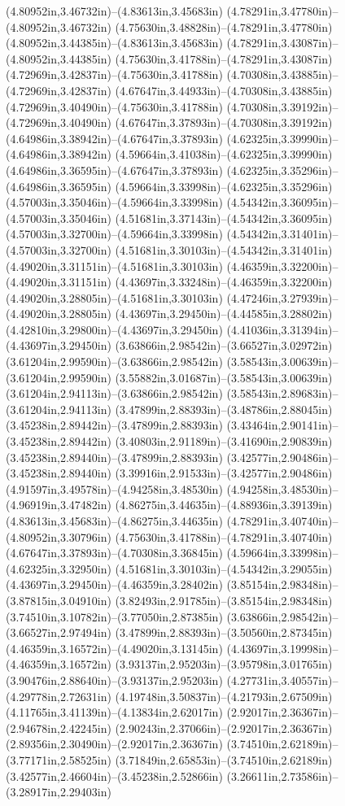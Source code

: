 (4.80952in,3.46732in)--(4.83613in,3.45683in) (4.78291in,3.47780in)--(4.80952in,3.46732in) (4.75630in,3.48828in)--(4.78291in,3.47780in) (4.80952in,3.44385in)--(4.83613in,3.45683in) (4.78291in,3.43087in)--(4.80952in,3.44385in) (4.75630in,3.41788in)--(4.78291in,3.43087in) (4.72969in,3.42837in)--(4.75630in,3.41788in) (4.70308in,3.43885in)--(4.72969in,3.42837in) (4.67647in,3.44933in)--(4.70308in,3.43885in) (4.72969in,3.40490in)--(4.75630in,3.41788in) (4.70308in,3.39192in)--(4.72969in,3.40490in) (4.67647in,3.37893in)--(4.70308in,3.39192in) (4.64986in,3.38942in)--(4.67647in,3.37893in) (4.62325in,3.39990in)--(4.64986in,3.38942in) (4.59664in,3.41038in)--(4.62325in,3.39990in) (4.64986in,3.36595in)--(4.67647in,3.37893in) (4.62325in,3.35296in)--(4.64986in,3.36595in) (4.59664in,3.33998in)--(4.62325in,3.35296in) (4.57003in,3.35046in)--(4.59664in,3.33998in) (4.54342in,3.36095in)--(4.57003in,3.35046in) (4.51681in,3.37143in)--(4.54342in,3.36095in) (4.57003in,3.32700in)--(4.59664in,3.33998in) (4.54342in,3.31401in)--(4.57003in,3.32700in) (4.51681in,3.30103in)--(4.54342in,3.31401in) (4.49020in,3.31151in)--(4.51681in,3.30103in) (4.46359in,3.32200in)--(4.49020in,3.31151in) (4.43697in,3.33248in)--(4.46359in,3.32200in) (4.49020in,3.28805in)--(4.51681in,3.30103in) (4.47246in,3.27939in)--(4.49020in,3.28805in) (4.43697in,3.29450in)--(4.44585in,3.28802in) (4.42810in,3.29800in)--(4.43697in,3.29450in) (4.41036in,3.31394in)--(4.43697in,3.29450in) (3.63866in,2.98542in)--(3.66527in,3.02972in) (3.61204in,2.99590in)--(3.63866in,2.98542in) (3.58543in,3.00639in)--(3.61204in,2.99590in) (3.55882in,3.01687in)--(3.58543in,3.00639in) (3.61204in,2.94113in)--(3.63866in,2.98542in) (3.58543in,2.89683in)--(3.61204in,2.94113in) (3.47899in,2.88393in)--(3.48786in,2.88045in) (3.45238in,2.89442in)--(3.47899in,2.88393in) (3.43464in,2.90141in)--(3.45238in,2.89442in) (3.40803in,2.91189in)--(3.41690in,2.90839in) (3.45238in,2.89440in)--(3.47899in,2.88393in) (3.42577in,2.90486in)--(3.45238in,2.89440in) (3.39916in,2.91533in)--(3.42577in,2.90486in) (4.91597in,3.49578in)--(4.94258in,3.48530in) (4.94258in,3.48530in)--(4.96919in,3.47482in) (4.86275in,3.44635in)--(4.88936in,3.39139in) (4.83613in,3.45683in)--(4.86275in,3.44635in) (4.78291in,3.40740in)--(4.80952in,3.30796in) (4.75630in,3.41788in)--(4.78291in,3.40740in) (4.67647in,3.37893in)--(4.70308in,3.36845in) (4.59664in,3.33998in)--(4.62325in,3.32950in) (4.51681in,3.30103in)--(4.54342in,3.29055in) (4.43697in,3.29450in)--(4.46359in,3.28402in) (3.85154in,2.98348in)--(3.87815in,3.04910in) (3.82493in,2.91785in)--(3.85154in,2.98348in) (3.74510in,3.10782in)--(3.77050in,2.87385in) (3.63866in,2.98542in)--(3.66527in,2.97494in) (3.47899in,2.88393in)--(3.50560in,2.87345in) (4.46359in,3.16572in)--(4.49020in,3.13145in) (4.43697in,3.19998in)--(4.46359in,3.16572in) (3.93137in,2.95203in)--(3.95798in,3.01765in) (3.90476in,2.88640in)--(3.93137in,2.95203in) (4.27731in,3.40557in)--(4.29778in,2.72631in) (4.19748in,3.50837in)--(4.21793in,2.67509in) (4.11765in,3.41139in)--(4.13834in,2.62017in) (2.92017in,2.36367in)--(2.94678in,2.42245in) (2.90243in,2.37066in)--(2.92017in,2.36367in) (2.89356in,2.30490in)--(2.92017in,2.36367in) (3.74510in,2.62189in)--(3.77171in,2.58525in) (3.71849in,2.65853in)--(3.74510in,2.62189in) (3.42577in,2.46604in)--(3.45238in,2.52866in) (3.26611in,2.73586in)--(3.28917in,2.29403in) 